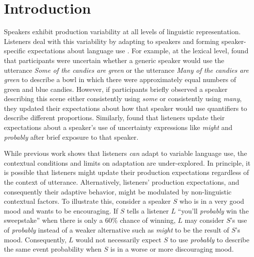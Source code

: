 \section{Introduction}

Speakers exhibit production variability at all levels of linguistic representation. Listeners deal with this variability by adapting to speakers and forming speaker-specific expectations about language use \parencite[e.g.,][]{Norris2003,Kraljic2005,Bradlow2008,Kurumada2012,Kamide2012,Kleinschmidt2015,Fine2016,Roettger2019}. For example, at the lexical level, \cite{Yildirim2016} found that participants were uncertain whether a generic speaker would use the utterance \textit{Some of the candies are green} or the utterance \textit{Many of the candies are green} to describe a bowl in which there were approximately equal numbers of green and blue candies. However, if participants briefly observed a speaker describing this scene either consistently using \textit{some} or consistently using \textit{many}, they updated their expectations about how that speaker would use quantifiers to describe different proportions. Similarly, \textcite[][henceforth S\&D]{Schuster2019} found that listeners update their expectations about a speaker's use of uncertainty expressions like \textit{might} and \textit{probably} after brief exposure to that speaker.

While previous work shows that listeners \emph{can} adapt to variable language use, the contextual conditions and limits on adaptation are under-explored. In principle, it is possible that listeners might update their production expectations regardless of the context of utterance.  Alternatively, listeners' production expectations, and consequently their adaptive behavior, might be modulated by non-linguistic contextual factors. To illustrate this, consider a speaker $S$ who is in a very good mood and wants to be encouraging. If $S$ tells a listener $L$ ``you'll \textit{probably} win the sweepstake'' when there is only a 60\% chance of winning, $L$ may consider $S$'s use of \textit{probably} instead of a weaker alternative such as \textit{might} to be the result of $S$'s mood. Consequently, $L$ would not necessarily expect $S$ to use \textit{probably} to describe the same event probability when $S$ is in a worse or more discouraging mood.


